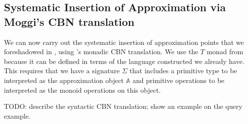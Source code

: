 \subsection{Systematic Insertion of Approximation via Moggi's CBN translation}
\label{sec:cbn-translation}

We can now carry out the systematic insertion of approximation points that we foreshadowed in
, using \citet[\S 3.1]{notions-of-computation}'s monadic CBN
translation. We use the $T$ monad from  because it can be defined in terms of the
language constructed we already have. This requires that we have a signature $\Sigma$ that includes a
primitive type to be interpreted as the approximation object $\mathbb{A}$ and primitive operations to be
interpreted as the monoid operations on this object.

TODO: describe the syntactic CBN translation; show an example on the query example.
